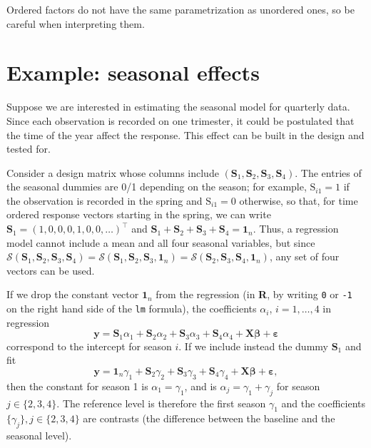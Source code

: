 \documentclass[]{book}
\theoremstyle{definition}
\theoremstyle{definition}
\theoremstyle{definition}
\theoremstyle{remark}
\begin{document}
Ordered factors do not have the same parametrization as unordered ones,
so be careful when interpreting them.

\hypertarget{example-seasonal-effects}{%
\section{Example: seasonal effects}\label{example-seasonal-effects}}

Suppose we are interested in estimating the seasonal model for quarterly
data. Since each observation is recorded on one trimester, it could be
postulated that the time of the year affect the response. This effect
can be built in the design and tested for.

Consider a design matrix whose columns include
\((\mathbf{S}_1, \mathbf{S}_2, \mathbf{S}_3, \mathbf{S}_4)\). The
entries of the seasonal dummies are 0/1 depending on the season; for
example, \(\mathrm{S}_{i1}=1\) if the observation is recorded in the
spring and \(\mathrm{S}_{i1}=0\) otherwise, so that, for time ordered
response vectors starting in the spring, we can write
\(\mathbf{S}_1=(1,0,0,0,1,0,0,\ldots)^\top\) and
\(\mathbf{S}_1 + \mathbf{S}_2 + \mathbf{S}_3 + \mathbf{S}_4 = \mathbf{1}_n\).
Thus, a regression model cannot include a mean and all four seasonal
variables, but since
\(\mathscr{S}(\mathbf{S}_1, \mathbf{S}_2, \mathbf{S}_3, \mathbf{S}_4) = \mathscr{S}(\mathbf{S}_1, \mathbf{S}_2, \mathbf{S}_3, \mathbf{1}_n) = \mathscr{S}(\mathbf{S}_2, \mathbf{S}_3, \mathbf{S}_4, \mathbf{1}_n)\),
any set of four vectors can be used.

If we drop the constant vector \(\mathbf{1}_n\) from the regression (in
\textbf{R}, by writing \texttt{0} or \texttt{-1} on the right hand side
of the \texttt{lm} formula), the coefficients \(\alpha_i\),
\(i=1, \ldots, 4\) in regression
\[\boldsymbol{y} = \mathbf{S}_1\alpha_1 +\mathbf{S}_2\alpha_2  + \mathbf{S}_3\alpha_3 + \mathbf{S}_4\alpha_4 + \mathbf{X}\boldsymbol{\beta} + \boldsymbol{\varepsilon}\]
correspond to the intercept for season \(i\). If we include instead the
dummy \(\mathbf{S}_1\) and fit
\[\boldsymbol{y} = \mathbf{1}_n\gamma_1 +\mathbf{S}_2\gamma_2  + \mathbf{S}_3\gamma_3 + \mathbf{S}_4\gamma_4 + \mathbf{X}\boldsymbol{\beta} + \boldsymbol{\varepsilon},\]
then the constant for season 1 is \(\alpha_1=\gamma_1\), and is
\(\alpha_j=\gamma_1+\gamma_j\) for season \(j \in \{2, 3, 4\}\). The
reference level is therefore the first season \(\gamma_1\) and the
coefficients \(\{\gamma_j\}, j \in \{2, 3, 4\}\) are contrasts (the
difference between the baseline and the seasonal level).
\end{document}
